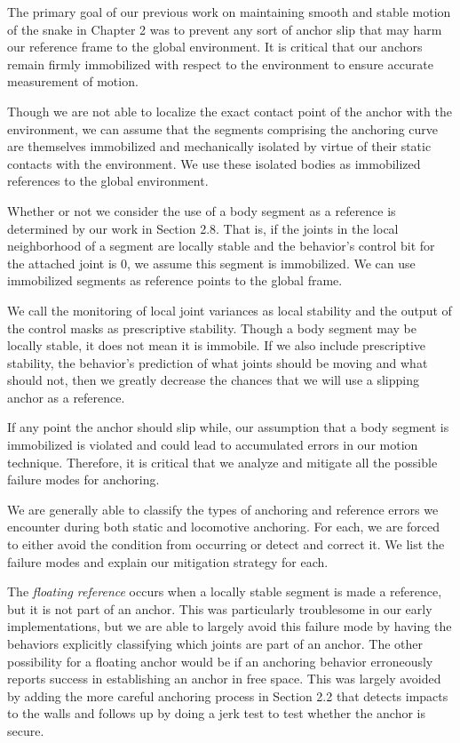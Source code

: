 The primary goal of our previous work on maintaining smooth and stable motion of the snake in Chapter 2 was to prevent any sort of anchor slip that may harm our reference frame to the global environment.  It is critical that our anchors remain firmly immobilized with respect to the environment to ensure accurate measurement of motion.

Though we are not able to localize the exact contact point of the anchor with the environment, we can assume that the segments comprising the anchoring curve are themselves immobilized and mechanically isolated by virtue of their static contacts with the environment.  We use these isolated bodies as immobilized references to the global environment.

Whether or not we consider the use of a body segment as a reference is determined by our work in Section 2.8.  That is, if the joints in the local neighborhood of a segment are locally stable and the behavior's control bit for the attached joint is 0, we assume this segment is immobilized.  We can use immobilized segments as reference points to the global frame.

We call the monitoring of local joint variances as local stability and the output of the control masks as prescriptive stability.  Though a body segment may be locally stable, it does not mean it is immobile.  If we also include prescriptive stability, the behavior's prediction of what joints should be moving and what should not, then we greatly decrease the chances that we will use a slipping anchor as a reference.

If any point the anchor should slip while, our assumption that a body segment is immobilized is violated and could lead to accumulated errors in our motion technique.  Therefore, it is critical that we analyze and mitigate all the possible failure modes for anchoring.

We are generally able to classify the types of anchoring and reference errors we encounter during both static and locomotive anchoring.  For each, we are forced to either avoid the condition from occurring or detect and correct it. We list the failure modes and explain our mitigation strategy for each.

The \emph{floating reference} occurs when a locally stable segment is made a reference, but it is not part of an anchor. This was particularly troublesome in our early implementations, but we are able to largely avoid this failure mode by having the behaviors explicitly classifying which joints are part of an anchor. The other possibility for a floating anchor would be if an anchoring behavior erroneously reports success in establishing an anchor in free space. This was largely avoided by adding the more careful anchoring process in Section 2.2 that detects impacts to the walls and follows up by doing a jerk test to test whether the anchor is secure.

